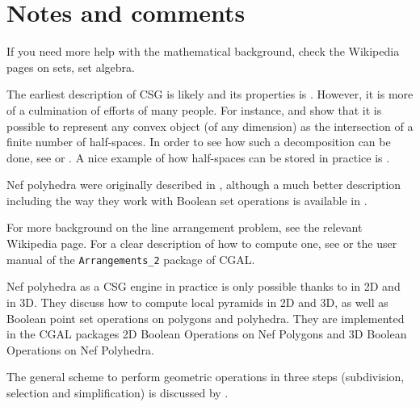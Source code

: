 %
\section{Notes and comments}

If you need more help with the mathematical background, check the Wikipedia pages on sets, set algebra.

The earliest description of CSG is likely \citet[\S{}12.3]{Requicha77} and its properties is \citet{Requicha78}.
However, it is more of a culmination of efforts of many people.
For instance, \citet{Shamos76} and \citet{Preparata79} show that it is possible to represent any convex object (of any dimension) as the intersection of a finite number of half-spaces.
In order to see how such a decomposition can be done, see \citet{Chazelle79} or \citet{Bajaj90}.
A nice example of how half-spaces can be stored in practice is \citet{Naylor90}.

Nef polyhedra were originally described in \citet{Nef78}, although a much better description including the way they work with Boolean set operations is available in \citet{Bieri88}.

For more background on the line arrangement problem, see the relevant Wikipedia page.
For a clear description of how to compute one, see \citet[\S{}2]{deBerg08} or the user manual of the \texttt{Arrangements\_2} package of CGAL.

Nef polyhedra as a CSG engine in practice is only possible thanks to \citet{Seel01} in 2D and \citet{Hachenberger06} in 3D.
They discuss how to compute local pyramids in 2D and 3D, as well as Boolean point set operations on polygons and polyhedra.
They are implemented in the CGAL packages 2D Boolean Operations on Nef Polygons and 3D Boolean Operations on Nef Polyhedra.

The general scheme to perform geometric operations in three steps (subdivision, selection and simplification) is discussed by \citet{Rossignac89}.
